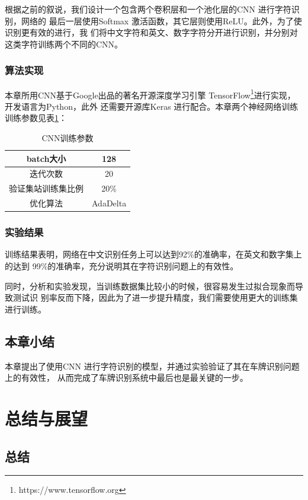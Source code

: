 根据之前的叙说，我们设计一个包含两个卷积层和一个池化层的CNN 进行字符识别，网络的
最后一层使用Softmax 激活函数，其它层则使用ReLU。此外，为了使识别更有效的进行，我
们将中文字符和英文、数字字符分开进行识别，并分别对这类字符训练两个不同的CNN。

\subsection{算法实现}

本章所用CNN基于Google出品的著名开源深度学习引擎
TensorFlow\footnote{https://www.tensorflow.org}进行实现，开发语言为Python，此外
还需要开源库Keras 进行配合。本章两个神经网络训练训练参数见表\ref{Tab:RecogCNNArgs}：

\begin{table}[ht]
\centering
\caption{CNN训练参数}\label{Tab:RecogCNNArgs}
\begin{tabular}{|c|c|}
\hline
  batch大小 & 128 \\
\hline
  迭代次数 & 20 \\
\hline
  验证集站训练集比例 & 20\% \\
\hline
  优化算法 & AdaDelta\cite{Zeiler:2012uw} \\
\hline
\end{tabular}
\end{table}

\subsection{实验结果}

训练结果表明，网络在中文识别任务上可以达到92\%的准确率，在英文和数字集上的达到
99\%的准确率，充分说明其在字符识别问题上的有效性。

同时，分析和实验发现，当训练数据集比较小的时候，很容易发生过拟合现象而导致测试识
别率反而下降，因此为了进一步提升精度，我们需要使用更大的训练集进行训练。

\section{本章小结}

本章提出了使用CNN 进行字符识别的模型，并通过实验验证了其在车牌识别问题上的有效性，
从而完成了车牌识别系统中最后也是最关键的一步。

\chapter{总结与展望}

\section{总结}

